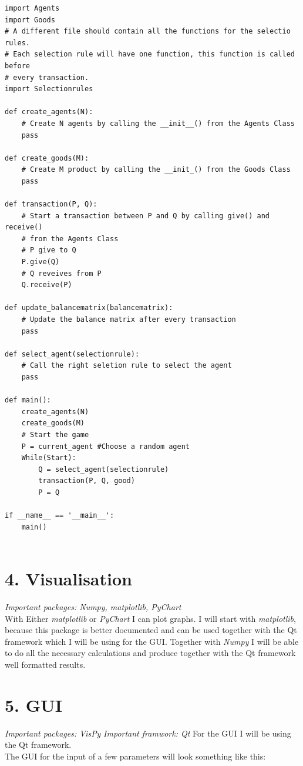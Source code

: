 \documentclass{article}
\begin{document}
\begin{lstlisting}
import Agents
import Goods
# A different file should contain all the functions for the selectio rules.
# Each selection rule will have one function, this function is called before
# every transaction.
import Selectionrules

def create_agents(N):
	# Create N agents by calling the __init__() from the Agents Class
	pass

def create_goods(M):
	# Create M product by calling the __init_() from the Goods Class
	pass

def transaction(P, Q):
	# Start a transaction between P and Q by calling give() and receive() 
	# from the Agents Class 
	# P give to Q
	P.give(Q)
	# Q reveives from P
	Q.receive(P)

def update_balancematrix(balancematrix):
	# Update the balance matrix after every transaction
	pass

def select_agent(selectionrule):
	# Call the right seletion rule to select the agent
	pass

def main():
	create_agents(N)
	create_goods(M)
	# Start the game 
	P = current_agent #Choose a random agent
	While(Start):
		Q = select_agent(selectionrule)
		transaction(P, Q, good)
		P = Q

if __name__ == '__main__':
    main()


\end{lstlisting}

\section{4. Visualisation}
\textit{Important packages: Numpy, matplotlib, PyChart}
\\
With Either \textit{matplotlib} or \textit{PyChart} I can plot graphs. I will start with \textit{matplotlib}, because this package is better documented and can be used together with the Qt framework which I will be using for the GUI. Together with \textit{Numpy} I will be able to do all the necessary calculations and produce together with the Qt framework well formatted results.
\section{5. GUI}
\textit{Important packages: VisPy}
\textit{Important framwork: Qt}
For the GUI I will be using the Qt framework. 
\\
The GUI for the input of a few parameters will look something like this:
\end{document}
